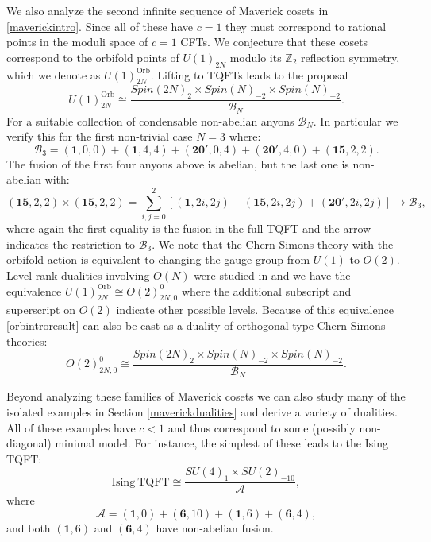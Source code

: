 \documentclass[11pt]{article}
\numberwithin{equation}{section}
\begin{document}
We also analyze the second infinite sequence of Maverick cosets in \eqref{maverickintro}.  Since all of these have $c=1$ they must correspond to rational points in the moduli space of $c=1$ CFTs.  We conjecture that these cosets correspond to the orbifold points of $U(1)_{2N}$ modulo its $\mathbb{Z}_{2}$ reflection symmetry, which we denote as $U(1)^{\mathrm{Orb}}_{2N}$.  Lifting to TQFTs leads to the proposal
\begin{equation}\label{orbintroresult}
    U(1)^{\mathrm{Orb}}_{2N} \cong \frac{Spin(2N)_{2} \times Spin(N)_{-2} \times Spin(N)_{-2} } {\mathcal{B}_{N}}.
\end{equation}
For a suitable collection of condensable non-abelian anyons $\mathcal{B}_{N}.$ In particular we verify this for the first non-trivial case $N=3$ where:
\begin{equation}
    \mathcal{B}_{3}=(\mathbf{1},0,0) + (\mathbf{1},4,4) + (\mathbf{20}',0,4) + (\mathbf{20}',4,0) + (\mathbf{15},2,2).
\end{equation}
The fusion of the first four anyons above is abelian, but the last one is non-abelian with:
\begin{equation}
    (\mathbf{15},2,2)\times (\mathbf{15},2,2)=  \sum_{i,j=0}^{2}\left[(\mathbf{1},2i,2j) + (\mathbf{15},2i,2j)+(\mathbf{20}',2i,2j)\right]\rightarrow \mathcal{B}_{3},
\end{equation}
where again the first equality is the fusion in the full TQFT and the arrow indicates the restriction to $\mathcal{B}_{3}.$  We note that the Chern-Simons theory with the orbifold action is equivalent to changing the gauge group from $U(1)$ to $O(2)$. Level-rank dualities involving $O(N)$ were studied in \cite{Cordova:2017vab} and we have the equivalence $U(1)^{\mathrm{Orb}}_{2N} \cong O(2)^{0}_{2N,0}$ where the additional subscript and superscript on $O(2)$ indicate other possible levels.  Because of this equivalence \eqref{orbintroresult} can also be cast as a duality of orthogonal type Chern-Simons theories:
\begin{equation}
    O(2)^{0}_{2N,0}\cong \frac{Spin(2N)_{2} \times Spin(N)_{-2} \times Spin(N)_{-2} } {\mathcal{B}_{N}}. 
\end{equation}

Beyond analyzing these families of Maverick cosets we can also study many of the isolated examples in Section \ref{maverickdualities} and derive a variety of dualities.  All of these examples have $c<1$ and thus correspond to some (possibly non-diagonal) minimal model. For instance, the simplest of these leads to the Ising TQFT:
\begin{equation}
    \mathrm{Ising \ TQFT} \cong \frac{SU(4)_{1} \times SU(2)_{-10}}{\mathcal{A}},
\end{equation}
where 
\begin{equation}
    \mathcal{A} = (\mathbf{1}, 0) + (\mathbf{6},10) + (\mathbf{1},6) + (\mathbf{6},4),
\end{equation}
and both $(\mathbf{1},6)$ and $(\mathbf{6},4)$ have non-abelian fusion.  
\end{document}
